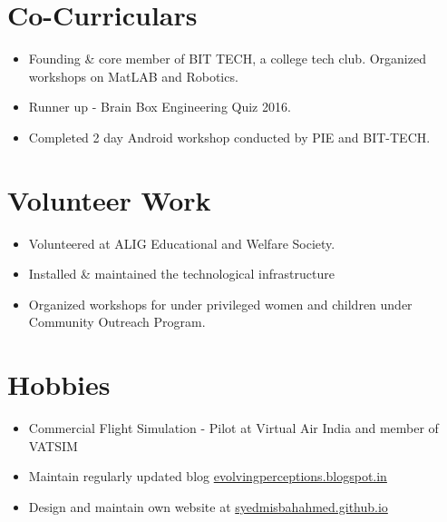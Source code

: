 \documentclass[letterpaper]{twentysecondcv} %
\begin{document}
\begin{multicols}{3}

\section{Co-Curriculars}
\begin{itemize}
\item Founding \& core member of BIT TECH, a college tech club. Organized workshops on MatLAB and Robotics.
\item Runner up - Brain Box Engineering Quiz 2016.
\item Completed 2 day Android workshop conducted by PIE and BIT-TECH. 
\end{itemize}

\columnbreak
 
\section{Volunteer Work }
\begin{itemize}
\item Volunteered at ALIG Educational and Welfare Society.
\item Installed \& maintained the technological infrastructure
\item Organized workshops for under privileged women and children under Community Outreach Program.
\end{itemize}

 \columnbreak

\section{Hobbies }
\begin{itemize}
\item Commercial Flight Simulation - Pilot at Virtual Air India and member of VATSIM
\item Maintain regularly updated blog {\href{https://evolvingperceptions1.blogspot.in/}{evolvingperceptions.blogspot.in}}
\item Design and maintain own website at \href{syedmisbahahmed.github.io}{syedmisbahahmed.github.io}
\end{itemize}


\end{multicols}
\end{document}
